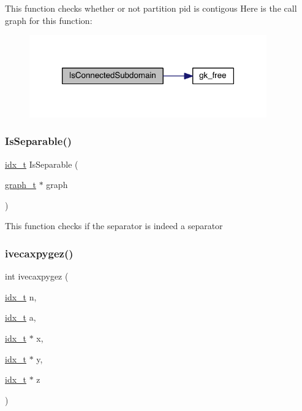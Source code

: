 This function checks whether or not partition pid is contigous Here is the call graph for this function\+:\nopagebreak
\begin{figure}[H]
\begin{center}
\leavevmode
\includegraphics[width=290pt]{a00945_a123c09e42bbe2336d7abe9b0ddbe9b98_cgraph}
\end{center}
\end{figure}
\mbox{\label{a00945_a4e20e266d94786939fcf423ec9dbe785}} 
\subsubsection{\texorpdfstring{Is\+Separable()}{IsSeparable()}}
{\footnotesize\ttfamily \hyperlink{a00876_aaa5262be3e700770163401acb0150f52}{idx\+\_\+t} Is\+Separable (\begin{DoxyParamCaption}\item[{\hyperlink{a00734}{graph\+\_\+t} $\ast$}]{graph }\end{DoxyParamCaption})}

This function checks if the separator is indeed a separator \mbox{\label{a00945_ab0dcd93bca76dcc3a266907b38b36ed7}} 
\subsubsection{\texorpdfstring{ivecaxpygez()}{ivecaxpygez()}}
{\footnotesize\ttfamily int ivecaxpygez (\begin{DoxyParamCaption}\item[{\hyperlink{a00876_aaa5262be3e700770163401acb0150f52}{idx\+\_\+t}}]{n,  }\item[{\hyperlink{a00876_aaa5262be3e700770163401acb0150f52}{idx\+\_\+t}}]{a,  }\item[{\hyperlink{a00876_aaa5262be3e700770163401acb0150f52}{idx\+\_\+t} $\ast$}]{x,  }\item[{\hyperlink{a00876_aaa5262be3e700770163401acb0150f52}{idx\+\_\+t} $\ast$}]{y,  }\item[{\hyperlink{a00876_aaa5262be3e700770163401acb0150f52}{idx\+\_\+t} $\ast$}]{z }\end{DoxyParamCaption})}

